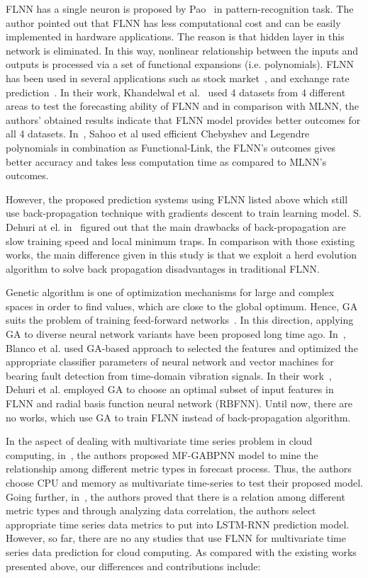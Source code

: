 \documentclass[conference]{IEEEtran}
\begin{document}
FLNN has a single neuron is proposed by Pao~\cite{ref_pao} in pattern-recognition task. The author pointed out that FLNN has less computational cost and can be easily implemented in hardware applications. The reason is that hidden layer in this network is eliminated. In this way, nonlinear relationship between the inputs and outputs is processed via a set of functional expansions (i.e. polynomials). FLNN has been used in several applications such as stock market~\cite{ref_majhi}, and exchange rate prediction~\cite{ref_rout}. In their work, Khandelwal et al.~\cite{ref_khan} used 4 datasets from 4 different areas to test the forecasting ability of FLNN and in comparison with MLNN, the authors' obtained results indicate that FLNN model provides better outcomes for all 4 datasets. In~\cite{ref_sahoo}, Sahoo et al used efficient Chebyshev and Legendre polynomials in combination as Functional-Link, the FLNN's outcomes gives better accuracy and takes less computation time as compared to MLNN's outcomes.

However, the proposed prediction systems using FLNN listed above which still use back-propagation technique with gradients descent to train learning model. S. Dehuri at el. in~\cite{ref_dehuri} figured out that the main drawbacks of back-propagation are slow training speed and local minimum traps. In comparison with those existing works, the main difference given in this study is that we exploit a herd evolution algorithm to solve back propagation disadvantages in traditional FLNN. 

Genetic algorithm is one of optimization mechanisms for large and complex spaces in order to find values, which are close to the global optimum. Hence, GA suits the problem of training feed-forward networks~\cite{ref_motana}. In this direction, applying GA to diverse neural network variants have been proposed long time ago. In~\cite{ref_blanco}, Blanco et al. used GA-based approach to selected the features and optimized the appropriate classifier parameters of neural network and vector machines for bearing fault detection from time-domain vibration signals. In their work~\cite{ref_dehuri_2}, Dehuri et al. employed GA to choose an optimal subset of input features in FLNN and radial basis function neural network (RBFNN). Until now, there are no works, which use GA to train FLNN instead of back-propagation algorithm. 

In the aspect of dealing with multivariate time series problem in cloud computing, in~\cite{ref_dang}, the authors proposed MF-GABPNN model to mine the relationship among different metric types in forecast process. Thus, the authors choose CPU and memory as multivariate time-series to test their proposed model. Going further, in~\cite{ref_nhuan}, the authors proved that there is a relation among different metric types and through analyzing data correlation, the authors select appropriate time series data metrics to put into LSTM-RNN prediction model. However, so far, there are no any studies that use FLNN for multivariate time series data prediction for cloud computing. As compared with the existing works presented above, our differences and contributions include:
\end{document}
